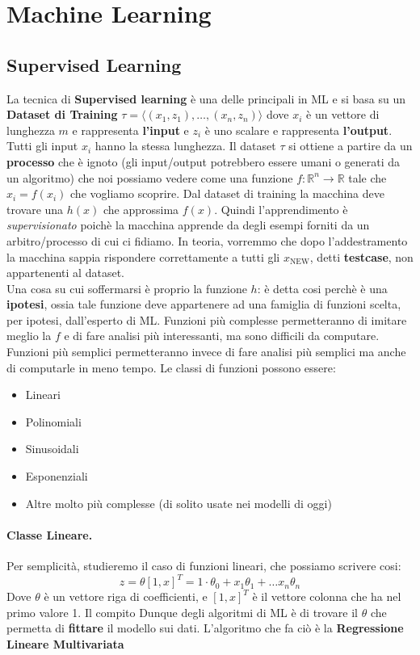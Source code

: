 \section{Machine Learning}
\subsection{Supervised Learning}
La tecnica di \textbf{Supervised learning} è una delle principali in ML e si basa su un \textbf{Dataset di Training} $\tau = \langle(x_1,z_1),\dots,(x_n,z_n)\rangle$
dove $x_i$ è un vettore di lunghezza $m$ e rappresenta \textbf{l'input} e $z_i$ è uno scalare e rappresenta \textbf{l'output}. Tutti gli input $x_i$ hanno la stessa lunghezza.
Il dataset $\tau$ si ottiene a partire da un \textbf{processo} che è ignoto (gli input/output potrebbero essere umani o generati
da un algoritmo) che noi possiamo vedere come una funzione $f : \mathbb{R}^n \to \mathbb{R}$ tale che $x_i = f(x_i)$ che vogliamo scoprire.
Dal dataset di training la macchina deve trovare una $h(x)$ che approssima $f(x)$. Quindi l'apprendimento è \textit{supervisionato}
poichè la macchina apprende da degli esempi forniti da un arbitro/processo di cui ci fidiamo. In teoria, vorremmo che dopo l'addestramento
la macchina sappia rispondere correttamente a tutti gli $x_\text{NEW}$, detti \textbf{testcase}, non appartenenti al dataset.\\
Una cosa su cui soffermarsi è proprio la funzione $h$: è detta cosi perchè è una \textbf{ipotesi}, ossia tale funzione deve appartenere ad una
famiglia di funzioni scelta, per ipotesi, dall'esperto di ML. Funzioni più complesse permetteranno di imitare meglio la $f$ e di fare analisi
più interessanti, ma sono difficili da computare. Funzioni più semplici permetteranno invece di fare analisi più semplici ma anche di computarle in
meno tempo. Le classi di funzioni possono essere:
\begin{itemize}
    \item Lineari
    \item Polinomiali
    \item Sinusoidali
    \item Esponenziali
    \item Altre molto più complesse (di solito usate nei modelli di oggi)
\end{itemize}

\paragraph{Classe Lineare.}Per semplicità, studieremo il caso di funzioni lineari, che possiamo scrivere cosi:
\begin{equation}
    z = \theta[1,x]^T = 1\cdot\theta_0 + x_1\theta_1 + \dots x_n\theta_n
\end{equation}
Dove $\theta$ è un vettore riga di coefficienti, e $[1,x]^T$ è il vettore colonna che ha nel primo valore 1. Il compito Dunque
degli algoritmi di ML è di trovare il $\theta$ che permetta di \textbf{fittare} il modello sui dati. L'algoritmo che fa ciò è la
\textbf{Regressione Lineare Multivariata}

